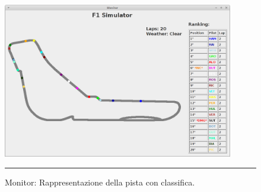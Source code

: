 \begin{figure}[htbp]
	\centering
		\includegraphics[keepaspectratio = true, width = 380px] {Pictures/monitor}
		\rule{35em}{0.5pt}
	\caption[Monitor]{Monitor: Rappresentazione della pista con classifica.}
	\label{fig:Monitor}
\end{figure}

